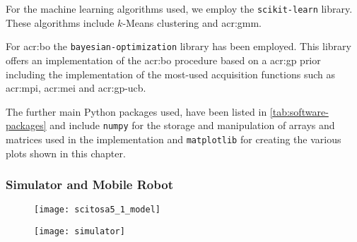 For the machine learning algorithms used, we employ the \texttt{scikit-learn} library. These algorithms include $k$-Means clustering and \acrfull{acr:gmm}.

For \acrlong{acr:bo} the \texttt{bayesian-optimization} library \cite{nogueirabayesianoptimization} has been employed. This library offers an implementation of the \acrshort{acr:bo} procedure based on a \acrshort{acr:gp} prior including the implementation of the most-used acquisition functions such as \acrshort{acr:mpi}, \acrshort{acr:mei} and \acrshort{acr:gp-ucb}.

The further main Python packages used, have been listed in \autoref{tab:software-packages} and include \texttt{numpy} for the storage and manipulation of arrays and matrices used in the implementation and \texttt{matplotlib} for creating the various plots shown in this chapter.

\subsubsection{Simulator and Mobile Robot}

\begin{figure}[t]
\centering
\begin{minipage}{0.4\textwidth}
	\centering
	\vspace{21pt}
	\texttt{[image: scitosa5\_1\_model]}
	\vspace{4pt}
	\label{fig:scitosa5}
\end{minipage}
\qquad
\begin{minipage}{0.525\textwidth}
	\centering
	\vspace{10pt}
	\texttt{[image: simulator]}
	\vspace{-10pt}
	\label{fig:simulator}
\end{minipage}
\quad
\end{figure}

